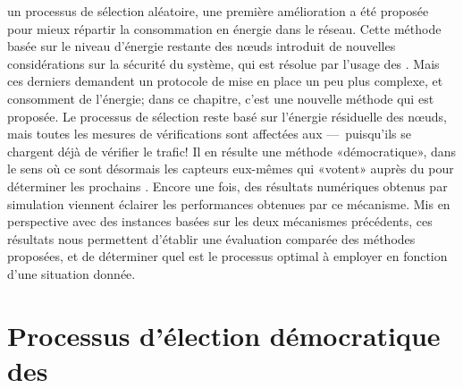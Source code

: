 \vfill
{} un processus de sélection aléatoire, une première amélioration a été proposée pour mieux répartir la consommation en énergie dans le réseau.
Cette méthode basée sur le niveau d'énergie restante des nœuds introduit de nouvelles considérations sur la sécurité du système, qui est résolue par l'usage des \vns.
Mais ces derniers demandent un protocole de mise en place un peu plus complexe, et consomment de l'énergie; dans ce chapitre, c'est une nouvelle méthode qui est proposée.
\vfill
Le processus de sélection reste basé sur l'énergie résiduelle des nœuds, mais toutes les mesures de vérifications sont affectées aux \cns ---~puisqu'ils se chargent déjà de vérifier le trafic!
Il en résulte une méthode «démocratique», dans le sens où ce sont désormais les capteurs eux-mêmes qui «votent» auprès du \ch pour déterminer les prochains \cns.
Encore une fois, des résultats numériques obtenus par simulation viennent éclairer les performances obtenues par ce mécanisme.
Mis en perspective avec des instances basées sur les deux mécanismes précédents, ces résultats nous permettent d'établir une évaluation comparée des méthodes proposées, et de déterminer quel est le processus optimal à employer en fonction d'une situation donnée.
\vfill

\pagebreak %
\section{Processus d'élection démocratique des \cns}\label{sd:sec:proposal}

